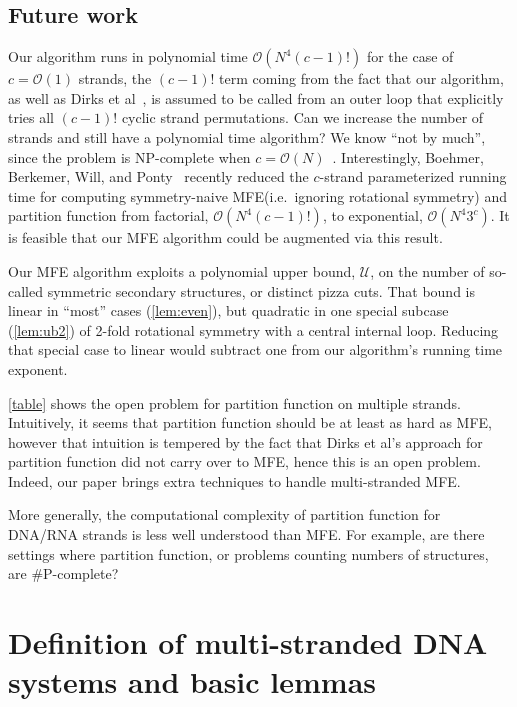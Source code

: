 \documentclass[11pt,letterpaper]{article}  \usepackage[margin=1in]{geometry}
\theoremstyle{definition}  \newtheorem{Definition}[theorem]{Definition}
\newcommand{\symnMFE}{symmetry-naive MFE\xspace}
\begin{document}
\subsection{Future work}
Our algorithm runs in polynomial time $\mathcal{O}(N^4 (c-1)!)$ for the case of $c=\mathcal{O}(1)$ strands, the $(c-1)!$ term coming from the fact that our algorithm, as well as Dirks et al~\cite{dirks2007thermodynamic}, is assumed to be called from an outer  loop that explicitly tries all $(c-1)!$ cyclic strand permutations. 
Can we increase the number of strands and still have a polynomial time algorithm? We know ``not by much'', since the problem is NP-complete when $c=\mathcal{O}(N)$~\cite{condon2021predicting}. 
Interestingly, Boehmer, Berkemer, Will, and Ponty~\cite{boehmer2024rna} recently reduced the $c$-strand parameterized running time for computing \symnMFE (i.e.~ignoring rotational symmetry) and partition function from factorial, $\mathcal{O}(N^4 (c-1)!)$, to exponential, $\mathcal{O}(N^4  3^c)$.  
It is feasible that our MFE algorithm could be augmented via this result.

Our MFE algorithm exploits a polynomial upper bound, $\mathcal{U}$, on the number of so-called symmetric secondary structures, or distinct  pizza cuts.  That bound is linear in ``most'' cases (\cref{lem:even}), but quadratic in one special subcase (\cref{lem:ub2}) of 2-fold rotational symmetry with a central internal loop. Reducing  that special case to linear would subtract one from  our algorithm's running time exponent.

\cref{table} shows the open problem for partition function on multiple strands. Intuitively, it seems that  partition function should be at least as hard as MFE, however that intuition is tempered by the fact that Dirks et al's approach for partition function did not carry over to MFE, hence this is an open problem. Indeed, our paper brings extra techniques to handle multi-stranded MFE.   

More generally, the computational complexity of partition function for DNA/RNA strands is less well understood than MFE. 
For example, are there settings where partition function, or problems counting numbers of structures, are {\#}P-complete?  	

\section{Definition of multi-stranded DNA systems and basic lemmas}\label{sec:mfe}
\end{document}
